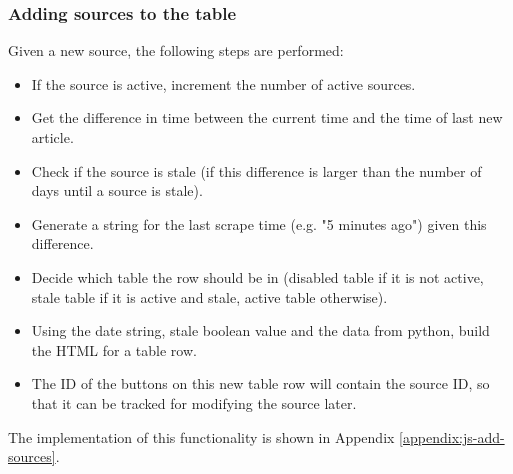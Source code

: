 \documentclass{l4proj}
\begin{document}
\subsubsection{Adding sources to the table} \hfill \par
Given a new source, the following steps are performed:
\begin{itemize}
    \item If the source is active, increment the number of active sources.
    \item Get the difference in time between the current time and the time of last new article.
    \item Check if the source is stale (if this difference is larger than the number of days until a source is stale).
    \item Generate a string for the last scrape time (e.g. "5 minutes ago") given this difference.
    \item Decide which table the row should be in (disabled table if it is not active, stale table if it is active and stale, active table otherwise).
    \item Using the date string, stale boolean value and the data from python, build the HTML for a table row.
    \item The ID of the buttons on this new table row will contain the source ID, so that it can be tracked for modifying the source later.    
\end{itemize}
The implementation of this functionality is shown in Appendix \ref{appendix:js-add-sources}.
\end{document}
